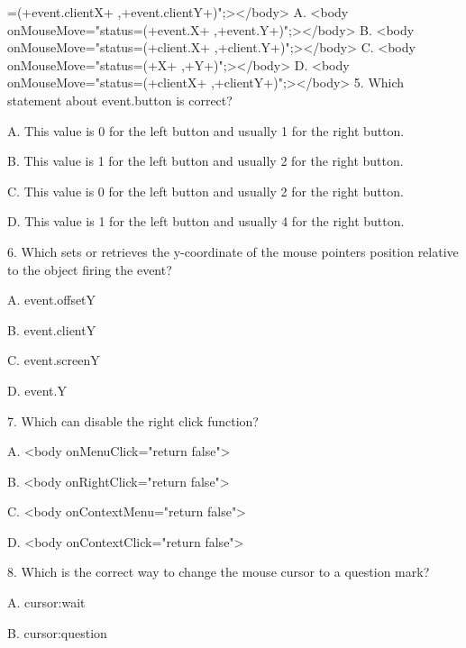 \documentclass[
]{article}
\begin{document}
=\textquotesingle(\textquotesingle+event.clientX+\textquotesingle{}
,\textquotesingle+event.clientY+\textquotesingle)\textquotesingle";\textgreater\textless/body\textgreater{}
A. \textless body
onMouseMove="status=\textquotesingle(\textquotesingle+event.X+\textquotesingle{}
,\textquotesingle+event.Y+\textquotesingle)\textquotesingle";\textgreater\textless/body\textgreater{}
B. \textless body
onMouseMove="status=\textquotesingle(\textquotesingle+client.X+\textquotesingle{}
,\textquotesingle+client.Y+\textquotesingle)\textquotesingle";\textgreater\textless/body\textgreater{}
C. \textless body
onMouseMove="status=\textquotesingle(\textquotesingle+X+\textquotesingle{}
,\textquotesingle+Y+\textquotesingle)\textquotesingle";\textgreater\textless/body\textgreater{}
D. \textless body
onMouseMove="status=\textquotesingle(\textquotesingle+clientX+\textquotesingle{}
,\textquotesingle+clientY+\textquotesingle)\textquotesingle";\textgreater\textless/body\textgreater{}
5. Which statement about event.button is correct?

A. This value is 0 for the left button and usually 1 for the right
button.

B. This value is 1 for the left button and usually 2 for the right
button.

C. This value is 0 for the left button and usually 2 for the right
button.

D. This value is 1 for the left button and usually 4 for the right
button.

6. Which sets or retrieves the y-coordinate of the mouse
pointer\textquotesingle s position relative to the object firing the
event?

A. event.offsetY

B. event.clientY

C. event.screenY

D. event.Y

7. Which can disable the right click function?

A. \textless body onMenuClick="return false"\textgreater{}

B. \textless body onRightClick="return false"\textgreater{}

C. \textless body onContextMenu="return false"\textgreater{}

D. \textless body onContextClick="return false"\textgreater{}

8. Which is the correct way to change the mouse cursor to a question
mark?

A. cursor:wait

B. cursor:question
\end{document}
